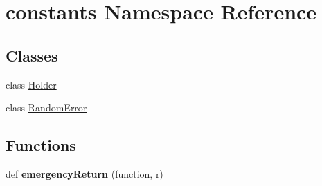 \hypertarget{namespaceconstants}{}\section{constants Namespace Reference}
\label{namespaceconstants}
\subsection*{Classes}
\begin{DoxyCompactItemize}
\item 
class \hyperlink{classconstants_1_1_holder}{Holder}
\item 
class \hyperlink{classconstants_1_1_random_error}{Random\+Error}
\end{DoxyCompactItemize}
\subsection*{Functions}
\begin{DoxyCompactItemize}
\item 
\hypertarget{namespaceconstants_abd830a1287c41765d6fd7644c7744608}{}def {\bfseries emergency\+Return} (function, r)\label{namespaceconstants_abd830a1287c41765d6fd7644c7744608}

\end{DoxyCompactItemize}

